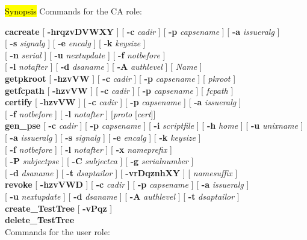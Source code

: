 \label{km}
\hl{Synopsis}
Commands for the CA role:

{\bf cacreate} [ {\bf -hrqzvDVWXY} ] [ {\bf -c} {\em cadir} ] [ {\bf -p} {\em capsename} ] [ {\bf -a} {\em issueralg} ]
             \\ \hspace*{1.6cm} [ {\bf -s} {\em signalg} ] [ {\bf -e} {\em encalg} ] [ {\bf -k} {\em keysize} ]
             \\ \hspace*{1.6cm} [ {\bf -n} {\em serial} ] [ {\bf -u} {\em nextupdate} ] [ {\bf -f} {\em notbefore} ]
	     \\ \hspace*{1.6cm} [ {\bf -l} {\em notafter} ] [ {\bf -d} {\em dsaname} ] [ {\bf -A} {\em authlevel} ] [ {\em Name} ] \\
{\bf getpkroot} [ {\bf -hzvVW} ] [ {\bf -c} {\em cadir} ] [ {\bf -p} {\em capsename} ] [ {\em pkroot} ] \\
{\bf getfcpath} [ {\bf -hzvVW} ] [ {\bf -c} {\em cadir} ] [ {\bf -p} {\em capsename} ] [ {\em fcpath} ] \\
{\bf certify} [ {\bf -hzvVW} ] [ {\bf -c} {\em cadir} ] [ {\bf -p} {\em capsename} ] [ {\bf -a} {\em issueralg} ] \\
\hspace*{1.6cm} [ {\bf -f} {\em notbefore} ] [ {\bf -l} {\em notafter} ] [{\em proto} [{\em cert}]] \\
{\bf gen\_pse} [ {\bf -c} {\em cadir} ] [ {\bf -p} {\em capsename} ] [ {\bf -i} {\em scriptfile} ] [ {\bf -h} {\em 
home} ] [ {\bf -u} {\em unixname} ] \\ 
\hspace*{1.6cm} [ {\bf -a} {\em issueralg} ] [ {\bf -s} {\em signalg} ] [ {\bf -e} {\em encalg} ] [ {\bf -k} {\em 
keysize} ] \\ 
\hspace*{1.6cm} [ {\bf -f} {\em notbefore} ] [ {\bf -l} {\em notafter} ] [ {\bf -x} {\em nameprefix} ]  \\ 
\hspace*{1.6cm} [ {\bf -P} {\em subjectpse} ] [ {\bf -C} {\em subjectca} ] [ {\bf -g} {\em serialnumber} ] \\
\hspace*{1.6cm} [ {\bf -d} {\em dsaname} ] [ {\bf -t} {\em dsaptailor} ] [ {\bf -vrDqznhXY} ] [ {\em namesuffix} ] \\
{\bf revoke} [ {\bf -hzvVWD} ] [ {\bf -c} {\em cadir} ] [ {\bf -p} {\em capsename} ] [ {\bf -a} {\em issueralg} ] 
             \\ \hspace*{1.6cm} [ {\bf -u} {\em nextupdate} ] [ {\bf -d} {\em dsaname} ] [ {\bf -A} {\em authlevel} ] [ {\bf -t} {\em dsaptailor} ] \\
{\bf create\_TestTree} [ {\bf -vPqz} ] \\
{\bf delete\_TestTree}
\\ [1em]
Commands for the user role:

